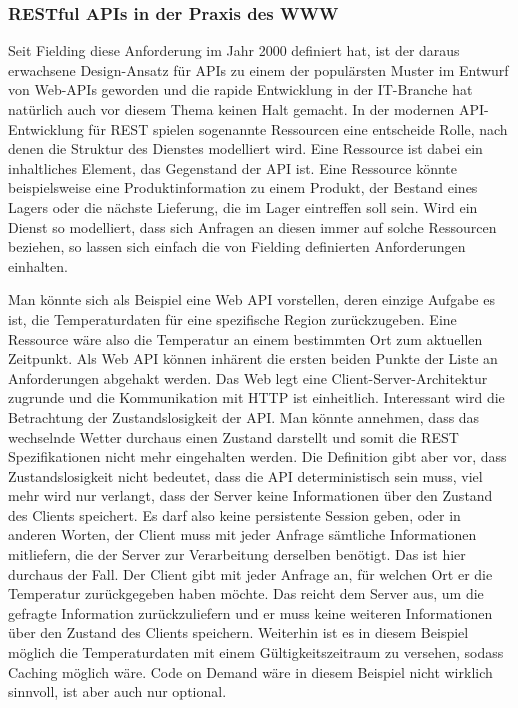 \subsubsection*{RESTful APIs in der Praxis des WWW}
Seit Fielding diese Anforderung im Jahr 2000 definiert hat, ist der daraus erwachsene Design-Ansatz für APIs zu einem der populärsten Muster im Entwurf von Web-APIs geworden und die rapide Entwicklung in der IT-Branche hat natürlich auch vor diesem Thema keinen Halt gemacht. In der modernen API-Entwicklung für REST spielen sogenannte Ressourcen eine entscheide Rolle, nach denen die Struktur des Dienstes modelliert wird. Eine Ressource ist dabei ein inhaltliches Element, das Gegenstand der API ist. Eine Ressource könnte beispielsweise eine Produktinformation zu einem Produkt, der Bestand eines Lagers oder die nächste Lieferung, die im Lager eintreffen soll sein. \cite[Vgl.][S. 81]{richardson2007web} Wird ein Dienst so modelliert, dass sich Anfragen an diesen immer auf solche Ressourcen beziehen, so lassen sich einfach die von Fielding definierten Anforderungen einhalten.

Man könnte sich als Beispiel eine Web API vorstellen, deren einzige Aufgabe es ist, die Temperaturdaten für eine spezifische Region zurückzugeben. Eine Ressource wäre also die Temperatur an einem bestimmten Ort zum aktuellen Zeitpunkt. Als Web API können inhärent die ersten beiden Punkte der Liste an Anforderungen abgehakt werden. Das Web legt eine Client-Server-Architektur zugrunde und die Kommunikation mit HTTP ist einheitlich. Interessant wird die Betrachtung der Zustandslosigkeit der API. Man könnte annehmen, dass das wechselnde Wetter durchaus einen Zustand darstellt und somit die REST Spezifikationen nicht mehr eingehalten werden. Die Definition gibt aber vor, dass Zustandslosigkeit nicht bedeutet, dass die API deterministisch sein muss, viel mehr wird nur verlangt, dass der Server keine Informationen über den Zustand des Clients speichert. Es darf also keine persistente Session geben, oder in anderen Worten, der Client muss mit jeder Anfrage sämtliche Informationen mitliefern, die der Server zur Verarbeitung derselben benötigt. Das ist hier durchaus der Fall. Der Client gibt mit jeder Anfrage an, für welchen Ort er die Temperatur zurückgegeben haben möchte. Das reicht dem Server aus, um die gefragte Information zurückzuliefern und er muss keine weiteren Informationen über den Zustand des Clients speichern. Weiterhin ist es in diesem Beispiel möglich die Temperaturdaten mit einem Gültigkeitszeitraum zu versehen, sodass Caching möglich wäre. Code on Demand wäre in diesem Beispiel nicht wirklich sinnvoll, ist aber auch nur optional.
